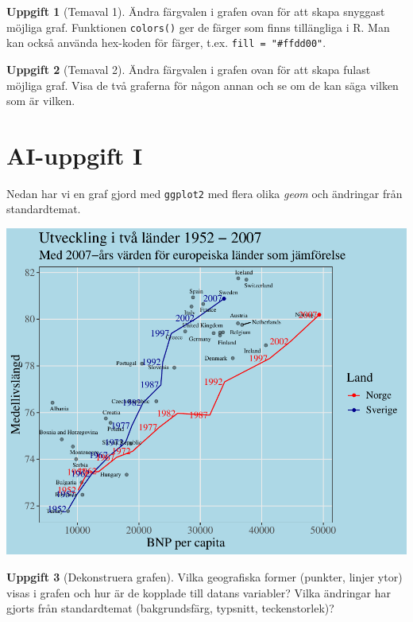 \documentclass[
]{book}
\theoremstyle{definition}
\theoremstyle{definition}
\theoremstyle{definition}
\newtheorem{exercise}{Uppgift}[chapter]
\theoremstyle{definition}
\theoremstyle{remark}
\begin{document}
\begin{exercise}[Temaval 1]
Ändra färgvalen i grafen ovan för att skapa snyggast möjliga graf. Funktionen \texttt{colors()} ger de färger som finns tillängliga i R. Man kan också använda hex-koden för färger, t.ex. \texttt{fill\ =\ "\#ffdd00"}.
\end{exercise}

\begin{exercise}[Temaval 2]
Ändra färgvalen i grafen ovan för att skapa fulast möjliga graf. Visa de två graferna för någon annan och se om de kan säga vilken som är vilken.
\end{exercise}

\section{AI-uppgift I}\label{ai-uppgift-i}

Nedan har vi en graf gjord med \texttt{ggplot2} med flera olika \emph{geom} och ändringar från standardtemat.

\begin{center}\includegraphics{R-anvisningar_files/figure-latex/unnamed-chunk-54-1} \end{center}

\begin{exercise}[Dekonstruera grafen]
Vilka geografiska former (punkter, linjer ytor) visas i grafen och hur är de kopplade till datans variabler? Vilka ändringar har gjorts från standardtemat (bakgrundsfärg, typsnitt, teckenstorlek)?
\end{exercise}
\end{document}
